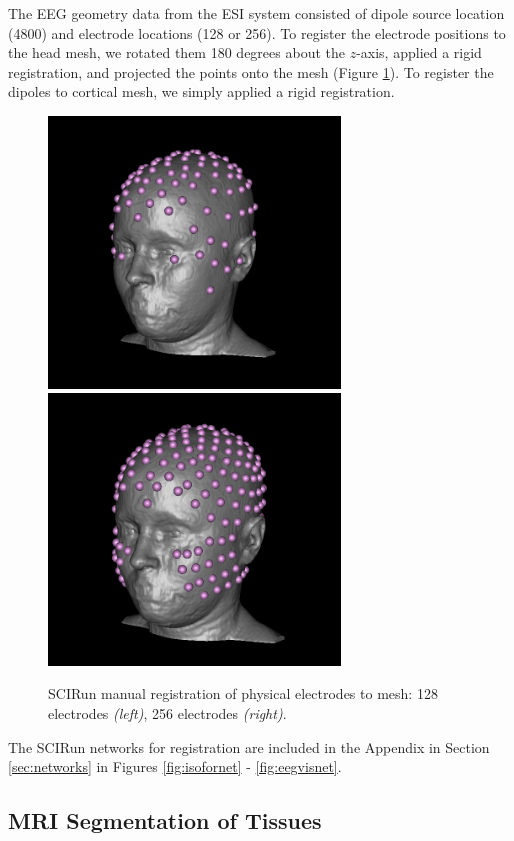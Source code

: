 The EEG geometry data from the ESI system consisted of dipole source location (4800) and electrode locations (128 or 256). To register the electrode positions to the head mesh, we rotated them 180 degrees about the $z$-axis, applied a rigid registration, and projected the points onto the mesh (Figure \ref{fig:eegreg}). To register the dipoles to cortical mesh, we simply applied a rigid registration.

\begin{figure}[H]
\begin{center}
\includegraphics[height = 2.84in]{Figures/128_eeg_reg}
\includegraphics[height = 2.84in]{Figures/256_eeg_reg}
\caption{SCIRun manual registration of physical electrodes to mesh: 128 electrodes \textit{(left)}, 256 electrodes \textit{(right)}.}
\label{fig:eegreg}
\end{center}
\end{figure}

The SCIRun networks for registration are included in the Appendix in Section \ref{sec:networks} in Figures \ref{fig:isofornet} - \ref{fig:eegvisnet}.

\subsection{MRI Segmentation of Tissues}
\label{sec:Seg}

